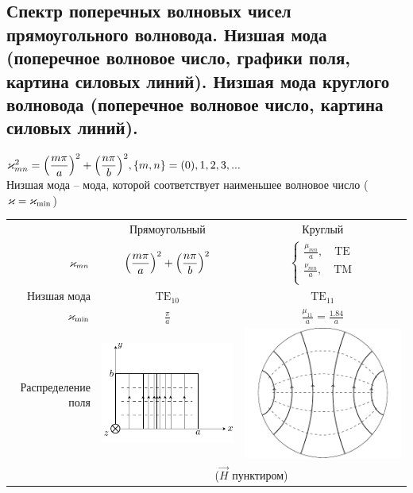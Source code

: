\begin{multicols*}{2}
		\section{Спектр поперечных волновых чисел прямоугольного волновода. Низшая мода (поперечное волновое число, графики поля, картина силовых линий). Низшая мода круглого волновода (поперечное волновое число, картина силовых линий).}
		
		$\varkappa_{mn}^2=\qty(\dfrac{m\pi}{a})^2+\qty(\dfrac{n\pi}{b})^2, \{m,n\} = (0),1,2,3,...$ \\
		Низшая мода – мода, которой соответствует наименьшее волновое число ($\varkappa=\varkappa_\text{min}$) \\
		
		\begin{tabular}{r *{2}{c}}
			{} & {Прямоугольный} & {Круглый} \\
			
			{$\varkappa_{mn}$} &
			{$\qty(\dfrac{m\pi}{a})^2+\qty(\dfrac{n\pi}{b})^2$} &
			{$\begin{cases}
					\frac{\mu_{mn}}{a}, \quad \text{TE} \\
					\frac{\nu_{mn}}{a}, \quad \text{TM}\\
				\end{cases}$} \\
			
			{Низшая мода} & {$\text{TE}_{10}$} & {$\text{TE}_{11}$} \\
			
			{$\varkappa_\text{min}$} & {$\frac \pi a$} & {$\frac {\mu_{11}}{a}=\frac {1.84}{a}$} \\
			
			{Распределение поля} &
			{\includegraphics[width=0.25\linewidth]{aed_imgs/lect4_ris8} } &
			{\includegraphics[width=0.25\linewidth]{aed_imgs/lect5_cylindric_TE11}}\\
			{} & \multicolumn{2}{c}{($\vec{H}$ пунктиром)} \\
		\end{tabular}
		

\end{multicols*}
